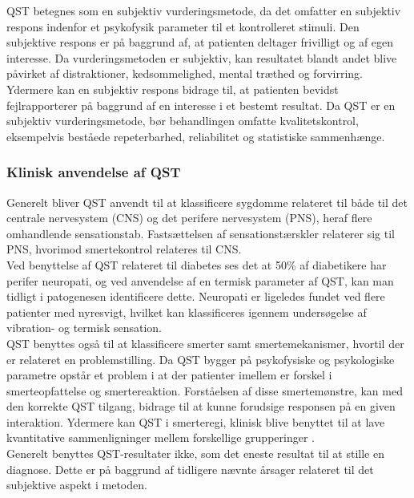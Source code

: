 QST betegnes som en subjektiv vurderingsmetode, da det omfatter en subjektiv respons indenfor et psykofysik parameter til et kontrolleret stimuli. Den subjektive respons er på baggrund af, at patienten deltager frivilligt og af egen interesse. \citep{Mucke2016} Da vurderingsmetoden er subjektiv, kan resultatet blandt andet blive påvirket af distraktioner, kedsommelighed, mental træthed og forvirring. Ydermere kan en subjektiv respons bidrage til, at patienten bevidst fejlrapporterer på baggrund af en interesse i et bestemt resultat. \citep{Yarnitsky2006} Da QST er en subjektiv vurderingsmetode, bør behandlingen omfatte kvalitetskontrol, eksempelvis beståede repeterbarhed, reliabilitet og statistiske sammenhænge.

\subsubsection{Klinisk anvendelse af QST}
Generelt bliver QST anvendt til at klassificere sygdomme relateret til både til det centrale nervesystem (CNS) og det perifere nervesystem (PNS), heraf flere omhandlende sensationstab. Fastsættelsen af sensationstærskler relaterer sig til PNS, hvorimod smertekontrol relateres til CNS. \\ 
Ved benyttelse af QST relateret til diabetes ses det at 50\% af diabetikere har perifer neuropati, og ved anvendelse af en termisk parameter af QST, kan man tidligt i patogenesen identificere dette. Neuropati er ligeledes fundet ved flere patienter med nyresvigt, hvilket kan klassificeres igennem undersøgelse af vibration- og termisk sensation. \citep{Yarnitsky1997} \citep{Yarnitsky2006} \\
QST benyttes også til at klassificere smerter samt smertemekanismer, hvortil der er relateret en problemstilling. Da QST bygger på psykofysiske og psykologiske parametre opstår et problem i at der patienter imellem er forskel i smerteopfattelse og smertereaktion. \citep{Yarnitsky1997} Forståelsen af disse smertemønstre, kan med den korrekte QST tilgang, bidrage til at kunne forudsige responsen på en given interaktion. \citep{Yarnitsky2006} Ydermere kan QST i smerteregi, klinisk blive benyttet til at lave kvantitative sammenligninger mellem forskellige grupperinger \citep{Arendt-Nielsen2009}. \\
Generelt benyttes QST-resultater ikke, som det eneste resultat til at stille en diagnose. Dette er på baggrund af tidligere nævnte årsager relateret til det subjektive aspekt i metoden. \citep{Yarnitsky2006}

